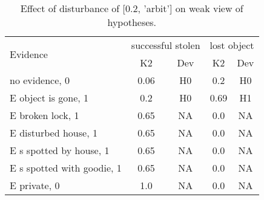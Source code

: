 \begin{table}\begin{tabular}{l|cc|cc}\toprule\multirow{2}{*}{Evidence} & \multicolumn{2}{c}{successful stolen}& \multicolumn{2}{c}{lost object}\\& {K2} & {Dev}& {K2} & {Dev}\\\midrule
no evidence, 0 & \cellcolor{Bittersweet}0.06&\cellcolor{Bittersweet}H0&\cellcolor{Bittersweet}0.2&\cellcolor{Bittersweet}H0\\E object is gone, 1 & \cellcolor{Bittersweet}0.2&\cellcolor{Bittersweet}H0&\cellcolor{Bittersweet}0.69&\cellcolor{Bittersweet}H1\\E broken lock, 1 & \cellcolor{Bittersweet}0.65&\cellcolor{Bittersweet}NA&\cellcolor{Bittersweet}0.0&\cellcolor{Bittersweet}NA\\E disturbed house, 1 & \cellcolor{Bittersweet}0.65&\cellcolor{Bittersweet}NA&\cellcolor{Bittersweet}0.0&\cellcolor{Bittersweet}NA\\E s spotted by house, 1 & \cellcolor{Bittersweet}0.65&\cellcolor{Bittersweet}NA&\cellcolor{Bittersweet}0.0&\cellcolor{Bittersweet}NA\\E s spotted with goodie, 1 & \cellcolor{Bittersweet}0.65&\cellcolor{Bittersweet}NA&\cellcolor{Bittersweet}0.0&\cellcolor{Bittersweet}NA\\E private, 0 & \cellcolor{Bittersweet}1.0&\cellcolor{Bittersweet}NA&\cellcolor{Bittersweet}0.0&\cellcolor{Bittersweet}NA\\\bottomrule\end{tabular}\caption{Effect of disturbance of [0.2, 'arbit'] on weak view of hypotheses.}\end{table}